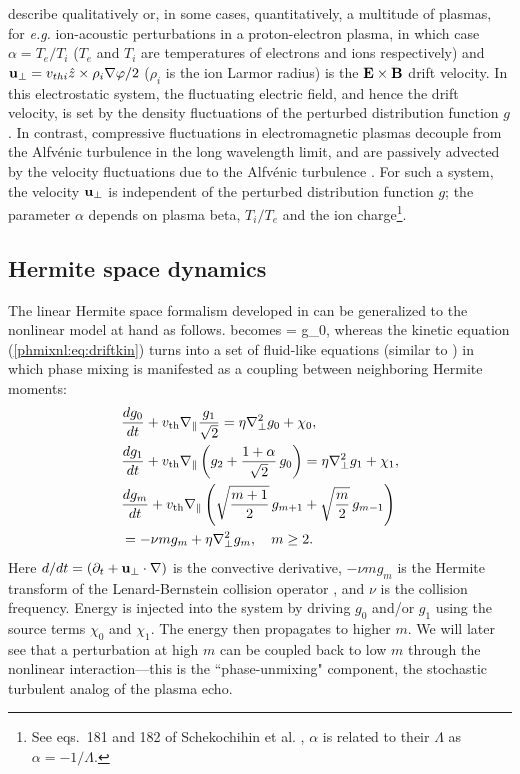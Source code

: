    
    describe qualitatively or, in some cases,
   quantitatively, a multitude of plasmas, for \textit{e.g.} ion-acoustic perturbations
   in a proton-electron plasma, in which case $\alpha = T_e/T_i$ ($T_e$ and $T_i$ are temperatures
   of electrons and ions respectively) and $\mathbf{u_\perp} = v_{thi}
   \hat{z}\times \rho_i \nabla \varphi/2$ ($\rho_i$ is the ion Larmor radius) is the
   $\mathbf{E} \times \mathbf{B}$ drift velocity. In this electrostatic system, the fluctuating electric field,
   and hence the drift velocity, is set by the density fluctuations of the perturbed distribution function $g$. In contrast,
   compressive fluctuations in electromagnetic plasmas decouple from the Alfv\'{e}nic
   turbulence in the long wavelength limit, and are
   passively advected by the velocity fluctuations due to the Alfv\'{e}nic
   turbulence \cite{tome}. For such a system, the velocity $\mathbf{u_\perp}$ is independent of the perturbed distribution function $g$; the
   parameter $\alpha$ depends on plasma beta, $T_i/T_e$ and the ion charge\footnote{See
   eqs.~181 and 182 of Schekochihin et al. \cite{tome}, $\alpha$ is related to their
   $\Lambda$ as $\alpha=-1/\Lambda$.}. 
   
\subsection{Hermite space dynamics}
\label{sec:hermite}

    The linear Hermite space formalism developed in  can be
    generalized to the nonlinear model at hand as follows.  becomes
\beq
    \phi = \alpha g_0,
    \label{phmixnl:eq:boltz_g0}
\eeq
whereas the kinetic equation (\eqref{phmixnl:eq:driftkin}) turns into a set of fluid-like
equations (similar to )
in which phase mixing is manifested as a coupling between neighboring Hermite moments:
\begin{align}
    \label{phmixnl:eq:g0}
    &\frac{d g_0}{d t} + v_{\rm th} \nabla_\parallel\frac{g_1}{\sqrt{2}}  = \eta \nabla_\perp^2
    g_0 + \chi_0,\\
    \label{phmixnl:eq:g1}
    &\frac{d g_1}{d t} + v_{\rm th} \nabla_\parallel\left(g_2 + \frac{1+\alpha}{\sqrt{2}}\,g_0\right)
    = \eta \nabla_\perp^2 g_1 + \chi_1,\\
    &\frac{d g_m}{d t} + v_{\rm th} \nabla_\parallel\left(\sqrt{\frac{m+1}{2}}\,g_{m+1} +
    \sqrt{\frac{m}{2}}\,g_{m-1}\right) \nonumber \\
    &= -\nu m g_m + \eta \nabla_\perp^2 g_m,  \quad m\ge2.
    \label{phmixnl:eq:gmeq}
\end{align}
Here $d/dt = \left(\partial_t + \mathbf{u_\perp}\cdot \nabla\right)$ is the convective derivative, 
$-\nu m g_m$ is the Hermite transform of the Lenard-Bernstein collision operator
\cite{lenard58}, and $\nu$ is the collision
frequency. Energy is injected into the system by driving
$g_0$ and/or $g_1$ using the source terms $\chi_0$ and $\chi_1$. The energy then propagates to higher $m$. 
We will later
see that a perturbation at high $m$ can be coupled back to low $m$ through the
nonlinear interaction---this is the ``phase-unmixing" component, the stochastic
turbulent analog of the plasma echo.

